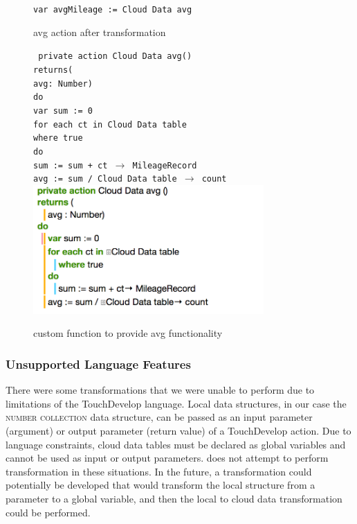 \documentclass{sigplanconf}
\begin{document}
\begin{figure}[htbp!]
\begin{center}
\texttt{var avgMileage := Cloud Data avg}
\nocaptionrule
\caption{avg action after transformation}
\label{fig:CloudTable_avg}
\end{center}

\end{figure}
\begin{figure}[htbp!]
\texttt{ private action Cloud Data avg()\\ 
returns(\\
avg: Number)\\
do\\
var sum := 0\\
for each ct in Cloud Data table\\
where true\\
do\\
sum := sum + ct $\rightarrow$ MileageRecord\\
avg := sum / Cloud Data table $\rightarrow$ count}
\includegraphics[width=250pt]{images/HelperFunction}
\nocaptionrule
\caption{custom function to provide avg functionality}
\label{fig:CloudTable_avg_fun}
\end{figure}

\subsubsection{Unsupported Language Features}
\label{sec:unsupportedLanguageFeatures}
There were some transformations that we were unable to perform due to limitations of the TouchDevelop language.  Local data structures, in our case the \textsc{number collection} data structure, can be passed as an input parameter (argument) or output parameter (return value) of a TouchDevelop action.  Due to language constraints, cloud data tables must be declared as global variables and cannot be used as input or output parameters.  \tool does not attempt to perform transformation in these situations.  In the future, a transformation could potentially be developed that would transform the local structure from a parameter to a global variable, and then the local to cloud data transformation could be performed.
\end{document}
